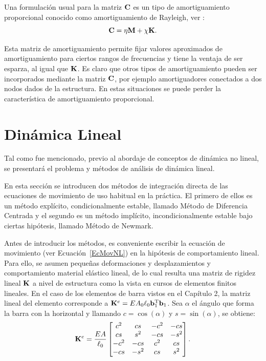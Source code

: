 Una formulación usual para la matriz ${\bf C}$ es un tipo de amortiguamiento proporcional conocido como amortiguamiento de Rayleigh, ver \citep{clough1993dynamics}:
%
\begin{equation} \label{eqn:amorRayl}
	{\bf C} = \eta {\bf M} + \chi {\bf K}.
\end{equation}

Esta matriz de amortiguamiento permite fijar valores aproximados de amortiguamiento para ciertos rangos de frecuencias y tiene la ventaja de ser esparza, al igual que ${\bf K}$. %
%
Es claro que otros tipos de amortiguamiento pueden ser incorporados mediante la matriz ${\bf C}$, por ejemplo amortiguadores conectados a dos nodos dados de la estructura. %
%
En estas situaciones se puede perder la característica de amortiguamiento proporcional.





\section{Dinámica Lineal}\label{DinLin}

Tal como fue mencionado, previo al abordaje de conceptos de dinámica no lineal, se presentará el problema y métodos de análisis de dinámica lineal. %
%

En esta sección se introducen dos métodos de integración directa de las ecuaciones de movimiento de uso habitual en la práctica. %
%
El primero de ellos es un método explícito, condicionalmente estable, llamado Método de Diferencia Centrada y el segundo es un método implícito, incondicionalmente estable bajo ciertas hipótesis, llamado Método de Newmark.


Antes de introducir los métodos, es conveniente escribir la ecuación de movimiento (ver Ecuación~\eqref{EcMovNL}) en la hipótesis de comportamiento lineal. %
%
Para ello, se asumen pequeñas deformaciones y desplazamientos y comportamiento material elástico lineal, de lo cual resulta una matriz de rigidez lineal ${\bf K}$ a nivel de estructura como la vista en cursos de elementos finitos lineales. %
%
En el caso de los elementos de barra vistos en el Capítulo 2, la matriz lineal del elemento corresponde a ${\bf K}^e=E A_0 \ell_0 {\bf b}_1^\text{T} {\bf b}_1$. %
%
Sea $\alpha$ el ángulo que forma la barra con la horizontal y llamando $c=\cos(\alpha)$ y $s=\sin(\alpha)$, se obtiene:
%
\begin{equation}
{\bf K}^e = \frac{E A}{\ell_0}
\left[\begin{matrix}
c^2 & c s & -c^2 & -c s\\
c s & s^2 & -c s & -s^2\\
-c^2 & -c s & c^2 & c s\\
-c s & -s^2 & c s & s^2\\
\end{matrix}
\right].
\end{equation}

